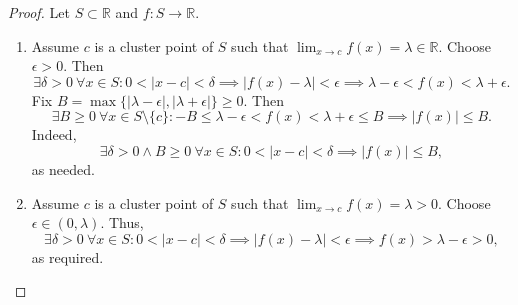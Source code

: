 \documentclass[12pt]{article}
\theoremstyle{definition}
\begin{document}
\begin{proof}
    Let \(S \subset \mathbb{R}\) and \(f : S \to \mathbb{R}\).
    \begin{enumerate}[label=(\alph*)]
        \item Assume \(c\) is a cluster point of \(S\) such that \(\lim_{x \to c}f(x) = \lambda \in \mathbb{R}\). Choose \(\epsilon > 0\). Then
        \[
            \exists \delta > 0 \ \forall x \in S : 0 < \vert x - c \vert < \delta \implies \vert f(x) - \lambda \vert < \epsilon \implies \lambda - \epsilon < f(x) < \lambda + \epsilon.
        \]
        Fix \(B = \max\{\vert \lambda - \epsilon \vert, \vert \lambda + \epsilon \vert\} \geq 0\). Then
        \[
            \exists B \geq 0 \ \forall x \in S \setminus \{c\} : - B \leq \lambda - \epsilon < f(x) < \lambda + \epsilon \leq B \implies \vert f(x) \vert \leq B.
        \]
        Indeed,
        \[
            \exists \delta > 0 \land B \geq 0 \ \forall x \in S : 0 < \vert x - c \vert < \delta \implies \vert f(x) \vert \leq B, 
        \]
        as needed.
        \item Assume \(c\) is a cluster point of \(S\) such that \(\lim_{x \to c}f(x) = \lambda > 0\). Choose \(\epsilon \in (0,\lambda)\). Thus,
        \[
            \exists \delta > 0 \ \forall x \in S : 0 < \vert x - c \vert < \delta \implies \vert f(x) - \lambda \vert <\epsilon \implies f(x) > \lambda - \epsilon > 0,
        \]
        as required.
    \end{enumerate}
\end{proof}
\end{document}
